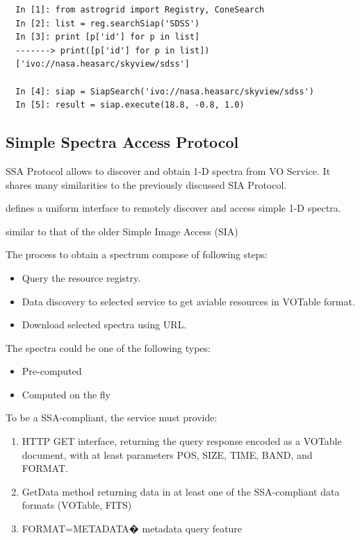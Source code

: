 \begin{lstlisting}
  In [1]: from astrogrid import Registry, ConeSearch
  In [2]: list = reg.searchSiap('SDSS')
  In [3]: print [p['id'] for p in list]
  -------> print([p['id'] for p in list])
  ['ivo://nasa.heasarc/skyview/sdss']
  
  In [4]: siap = SiapSearch('ivo://nasa.heasarc/skyview/sdss')
  In [5]: result = siap.execute(18.8, -0.8, 1.0)
\end{lstlisting}



 

\subsection{Simple Spectra Access Protocol}

SSA Protocol allows to discover and obtain 1-D spectra from VO
Service. It shares many similarities to the previously discussed SIA
Protocol.

defines a uniform interface to remotely discover and access simple 1-D spectra. 

similar to that of the older Simple Image Access (SIA)

The process to obtain a spectrum compose of following steps:

\begin{itemize}
\item Query the resource registry.
\item Data discovery to selected service to get aviable resources in
  VOTable format.
\item Download selected spectra using URL.
\end{itemize}

The spectra could be one of the following types:

\begin{itemize}
\item Pre-computed
\item Computed on the fly
\end{itemize}

To be a SSA-compliant, the service must provide:

\begin{enumerate}
\item HTTP GET interface, returning the query response encoded as a
VOTable document, with at least parameters POS, SIZE, TIME, BAND, and FORMAT.
\item GetData method returning data in at least one of the
  SSA-compliant data formats (VOTable, FITS)
\item FORMAT=METADATA� metadata query feature
\end{enumerate}


